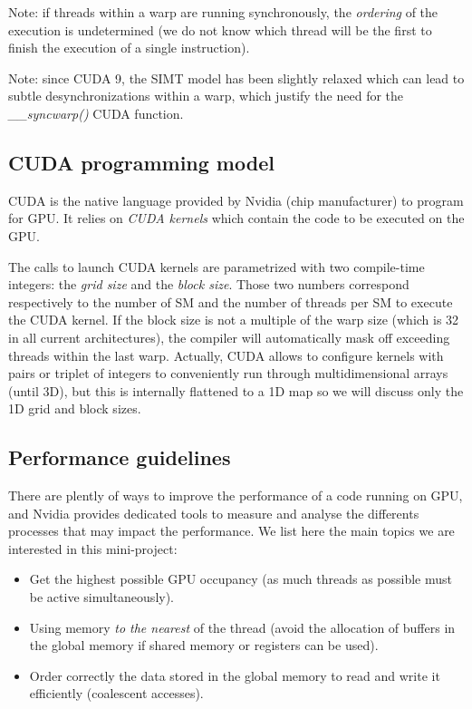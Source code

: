 \documentclass{article}
\begin{document}
Note: if threads within a warp are running synchronously, the \textit{ordering} of the execution is undetermined (we do not know which thread will be the first to finish the execution of a single instruction).

Note: since CUDA 9, the SIMT model has been slightly relaxed which can lead to subtle desynchronizations within a warp, which justify the need for the \textit{\_\_syncwarp()} CUDA function.

\subsection{CUDA programming model}

CUDA is the native language provided by Nvidia (chip manufacturer) to program for GPU. It relies on \textit{CUDA kernels} which contain the code to be executed on the GPU. 

The calls to launch CUDA kernels are parametrized with two compile-time integers: the \textit{grid size} and the \emph{block size}. Those two numbers correspond respectively to the number of SM and the number of threads per SM to execute the CUDA kernel. If the block size is not a multiple of the warp size (which is 32 in all current architectures), the compiler will automatically mask off exceeding threads within the last warp. Actually, CUDA allows to configure kernels with pairs or triplet of integers to conveniently run through multidimensional arrays (until 3D), but this is internally flattened to a 1D map so we will discuss only the 1D grid and block sizes.

\subsection{Performance guidelines}

There are plently of ways to improve the performance of a code running on GPU, and Nvidia provides dedicated tools to measure and analyse the differents processes that may impact the performance. We list here the main topics we are interested in this mini-project:

\begin{itemize}
	\item Get the highest possible GPU occupancy (as much threads as possible must be active simultaneously).
	\item Using memory \textit{to the nearest} of the thread (avoid the allocation of buffers in the global memory if shared memory or registers can be used).
	\item Order correctly the data stored in the global memory to read and write it efficiently (coalescent accesses).
\end{itemize}
\end{document}
